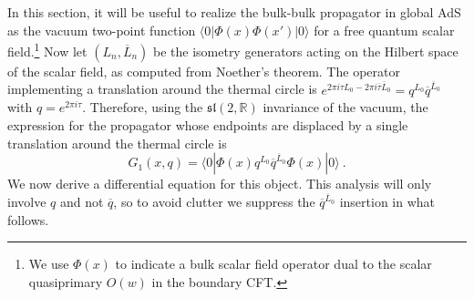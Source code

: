 \documentclass[12pt]{article}
\newcommand{\sltwo}{$\lie{sl}(2,\RR)$ }
\newcommand{\RR}{\mathbb{R}}
\newcommand{\lie}[1]{\mathfrak{#1}}
\begin{document}
In this section, it will be useful to realize the bulk-bulk propagator in global AdS as the vacuum two-point function $ \langle 0|\Phi(x) \Phi(x')|0\rangle$ for a free quantum scalar field.\footnote{We use $\Phi(x)$ to indicate a bulk scalar field operator dual to the scalar quasiprimary $O(w)$ in the boundary CFT.}
%
Now let $(L_n,\overline{L}_n)$ be the isometry generators acting on the Hilbert space of the scalar field, as computed from Noether's theorem.   The operator implementing a translation around the thermal circle is $e^{2\pi i\tau L_0 -2\pi i \overline{\tau} \overline{L}_0} = q^{L_0}  \overline{q}^{\overline{L}_0}$ with $q=e^{2\pi i \tau}$.  Therefore, using the \sltwo invariance of the vacuum, the expression for the propagator whose endpoints are displaced by a single translation around the thermal circle is
%
\begin{equation}
G_1(x,q) =  \langle 0|\Phi(x)q^{L_0} \overline{q}^{\overline{L}_0} \Phi(x)|0\rangle~. \end{equation}
%
We now derive a differential equation for this object.  This analysis will only involve $q$ and not $\overline{q}$, so to avoid clutter we suppress the $ \overline{q}^{\overline{L}_0}$ insertion in what follows.
\end{document}
